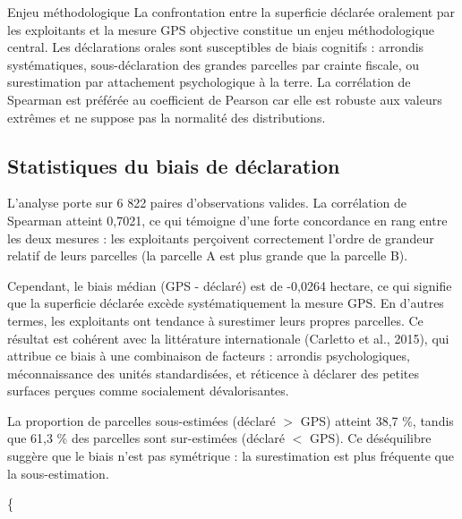 \documentclass[
  french,
  10pt,
]{article}
\begin{document}
\begin{methodbox}{Enjeu méthodologique}
La confrontation entre la superficie déclarée oralement par les exploitants et la mesure GPS objective constitue un enjeu méthodologique central. Les déclarations orales sont susceptibles de biais cognitifs : arrondis systématiques, sous-déclaration des grandes parcelles par crainte fiscale, ou surestimation par attachement psychologique à la terre. La corrélation de Spearman est préférée au coefficient de Pearson car elle est robuste aux valeurs extrêmes et ne suppose pas la normalité des distributions.
\end{methodbox}

\subsection{Statistiques du biais de
déclaration}\label{statistiques-du-biais-de-duxe9claration}

L'analyse porte sur 6 822 paires d'observations valides. La corrélation
de Spearman atteint 0,7021, ce qui témoigne d'une forte concordance en
rang entre les deux mesures : les exploitants perçoivent correctement
l'ordre de grandeur relatif de leurs parcelles (la parcelle A est plus
grande que la parcelle B).

Cependant, le biais médian (GPS - déclaré) est de -0,0264 hectare, ce
qui signifie que la superficie déclarée excède systématiquement la
mesure GPS. En d'autres termes, les exploitants ont tendance à
surestimer leurs propres parcelles. Ce résultat est cohérent avec la
littérature internationale (Carletto et al., 2015), qui attribue ce
biais à une combinaison de facteurs : arrondis psychologiques,
méconnaissance des unités standardisées, et réticence à déclarer des
petites surfaces perçues comme socialement dévalorisantes.

La proportion de parcelles sous-estimées (déclaré \(>\) GPS) atteint
38,7 \%, tandis que 61,3 \% des parcelles sont sur-estimées (déclaré
\(<\) GPS). Ce déséquilibre suggère que le biais n'est pas symétrique :
la surestimation est plus fréquente que la sous-estimation.

\{ \small {}
\end{document}

